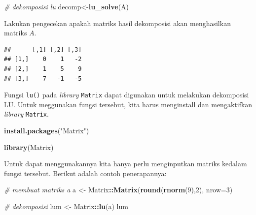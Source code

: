 \documentclass[]{book}
\newenvironment{Shaded}{\begin{snugshade}}{\end{snugshade}}
\newcommand{\CommentTok}[1]{\textcolor[rgb]{0.56,0.35,0.01}{\textit{#1}}}
\newcommand{\DataTypeTok}[1]{\textcolor[rgb]{0.13,0.29,0.53}{#1}}
\newcommand{\DecValTok}[1]{\textcolor[rgb]{0.00,0.00,0.81}{#1}}
\newcommand{\KeywordTok}[1]{\textcolor[rgb]{0.13,0.29,0.53}{\textbf{#1}}}
\newcommand{\NormalTok}[1]{#1}
\newcommand{\OperatorTok}[1]{\textcolor[rgb]{0.81,0.36,0.00}{\textbf{#1}}}
\newcommand{\StringTok}[1]{\textcolor[rgb]{0.31,0.60,0.02}{#1}}
\theoremstyle{definition}
\theoremstyle{definition}
\theoremstyle{definition}
\theoremstyle{remark}
\begin{document}
\begin{Shaded}
\begin{Highlighting}[]
\CommentTok{# dekomposisi lu}
\NormalTok{decomp<-}\KeywordTok{lu_solve}\NormalTok{(A)}
\end{Highlighting}
\end{Shaded}

Lakukan pengecekan apakah matriks hasil dekomposisi akan menghasilkan matriks \(A\).

\begin{Shaded}
\end{Shaded}

\begin{verbatim}
##      [,1] [,2] [,3]
## [1,]    0    1   -2
## [2,]    1    5    9
## [3,]    7   -1   -5
\end{verbatim}

Fungsi \texttt{lu()} pada \emph{library} \texttt{Matrix} dapat digunakan untuk melakukan dekomposisi LU. Untuk meggunakan fungsi tersebut, kita harus menginstall dan mengaktifkan \emph{library} \texttt{Matrix}.

\begin{Shaded}
\begin{Highlighting}[]
\KeywordTok{install.packages}\NormalTok{(}\StringTok{"Matrix"}\NormalTok{)}
\end{Highlighting}
\end{Shaded}

\begin{Shaded}
\begin{Highlighting}[]
\KeywordTok{library}\NormalTok{(Matrix)}
\end{Highlighting}
\end{Shaded}

Untuk dapat menggunakannya kita hanya perlu menginputkan matriks kedalam fungsi tersebut. Berikut adalah contoh penerapannya:

\begin{Shaded}
\begin{Highlighting}[]
\CommentTok{# membuat matriks a }
\NormalTok{a <-}\StringTok{ }\NormalTok{Matrix}\OperatorTok{::}\KeywordTok{Matrix}\NormalTok{(}\KeywordTok{round}\NormalTok{(}\KeywordTok{rnorm}\NormalTok{(}\DecValTok{9}\NormalTok{),}\DecValTok{2}\NormalTok{), }\DataTypeTok{nrow=}\DecValTok{3}\NormalTok{)}

\CommentTok{# dekomposisi}
\NormalTok{lum <-}\StringTok{ }\NormalTok{Matrix}\OperatorTok{::}\KeywordTok{lu}\NormalTok{(a)}
\NormalTok{lum}
\end{Highlighting}
\end{Shaded}
\end{document}
